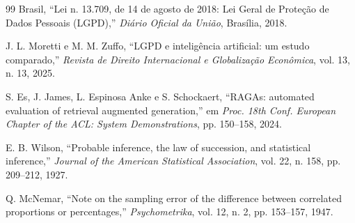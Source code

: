 \documentclass[conference]{IEEEtran}
\begin{document}
\begin{thebibliography}{99}
Brasil, ``Lei n. 13.709, de 14 de agosto de 2018: Lei Geral de Proteção de Dados Pessoais (LGPD),'' \emph{Diário Oficial da União}, Brasília, 2018.

J. L. Moretti e M. M. Zuffo, ``LGPD e inteligência artificial: um estudo comparado,'' \emph{Revista de Direito Internacional e Globalização Econômica}, vol. 13, n. 13, 2025.

S. Es, J. James, L. Espinosa Anke e S. Schockaert, ``RAGAs: automated evaluation of retrieval augmented generation,'' em \emph{Proc. 18th Conf. European Chapter of the ACL: System Demonstrations}, pp. 150--158, 2024.

E. B. Wilson, ``Probable inference, the law of succession, and statistical inference,'' \emph{Journal of the American Statistical Association}, vol. 22, n. 158, pp. 209--212, 1927.

Q. McNemar, ``Note on the sampling error of the difference between correlated proportions or percentages,'' \emph{Psychometrika}, vol. 12, n. 2, pp. 153--157, 1947.

\end{thebibliography}
\end{document}
